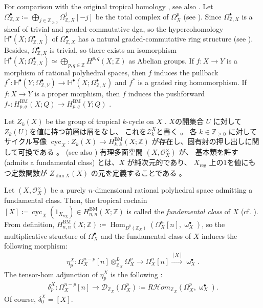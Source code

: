 \documentclass[a4paper,dvipdfmx,reqno,12pt]{amsart}
\theoremstyle{definition}
\newcommand{\deq}{\coloneqq}
\newcommand{\opn}[1]{\operatorname{#1}}
\newcommand{\xto}[1]{\xrightarrow{#1}}
\numberwithin{equation}{section}
\begin{document}
For comparison with the original
tropical homology \cite{MR3330789,MR3961331},
see also \cite[Remark 2.8 and Theorem 4.20]{MR4637248}.
Let $\Omega_{\mathbb{Z},X}^{\bullet}
\deq \bigoplus_{j\in \mathbb{Z}_{\geq 0}}
\Omega_{\mathbb{Z},X}^{j}[-j]$ 
be the total complex of 
$\Omega_{X}^{p}$ 
(see \cite[Proposition 3.1]{smacka2017differential}).
Since $\Omega_{\mathbb{Z},X}^{\bullet}$ is a sheaf
of trivial and graded-commutative dga, so the
hypercohomology 
$\mathbb{H}^{\bullet}(X;\Omega_{\mathbb{Z},X}^{\bullet})$
of $\Omega_{\mathbb{Z},X}^{\bullet}$ has
a natural graded-commutative ring structure
(see \cite[Remark 21.130]{gortzwedhorn2023}).
Besides, $\Omega_{\mathbb{Z},X}^{\bullet}$ is trivial,
so there exists an isomorphism
$\mathbb{H}^{\bullet}(X;\Omega_{\mathbb{Z},X}^{\bullet})
\simeq \bigoplus_{p,q\in \mathbb{Z}}
H^{p,q}(X;\mathbb{Z})$ as Abelian groups.
If $f\colon X\to Y$ is a morphism of
rational polyhedral spaces, then
$f$ induces the pullback
$f^{*}\colon \mathbb{H}^{\bullet}(Y;\Omega_{\mathbb{Z},Y}^{\bullet})
\to \mathbb{H}^{\bullet}(X;\Omega_{\mathbb{Z},X}^{\bullet})$
\cite[Proposition 4.18]{MR4637248} and $f^{*}$ is
a graded ring homomorphism.
If $f\colon X\to Y$ is a proper morphism, then
$f$ induces the pushforward 
$f_*\colon H^{\opn{BM}}_{p,q}(X;Q)\to 
H^{\opn{BM}}_{p,q}(Y;Q)$ \cite[Definition 4.9]{MR4637248}.

Let $Z_k(X)$ be the group of tropical $k$-cycle 
on $X$ \cite[Definition 3.5]{MR4637248}.
$X$の開集合 $U$ に対して$Z_k(U)$を値に持つ前層は層をなし、
これを$\mathscr{Z}_k^{X}$と書く
\cite[p.591]{MR4637248}。
各 $k\in \mathbb{Z}_{\geq 0}$ に対してサイクル写像
$\opn{cyc}_X \colon Z_k(X)\to 
H^{\mathrm{BM}}_{k,k}(X;\mathbb{Z})$
が存在し、固有射の押し出しに関して可換である
\cite[Definition 5.4 and Corollary 5.8]{MR4637248}。
(see also \cite[Definition 4.13]{MR3894860})
有理多面空間
$(X,\mathcal{O}_X^{\times})$ が、
基本類を許す
(admits a fundamental class)
とは、$X$ が純次元的であり、
$X_{\opn{reg}}$ 
上の$1$を値にもつ定数関数が
$Z_{\dim X}(X)$ の元を定義することである
\cite[]{MR4637248}。

Let $(X,\mathcal{O}_X^{\times})$ be 
a purely $n$-dimensional rational polyhedral space
admitting a fundamental class. Then, the
tropical cochain
$[X]\deq \opn{cyc}_X(1_{X_{\opn{reg}}})
\in H_{n,n}^{\mathrm{BM}}(X;\mathbb{Z})$ 
is called the \emph{fundamental class} of $X$
(cf. \cite[Definition 4.8]{MR3894860}). From definition,
$H_{n,n}^{\mathrm{BM}}
(X;\mathbb{Z})\deq \opn{Hom}_{D^{b}(\mathbb{Z}_X)}
(\Omega_{X}^{n}[n],\upomega_{X}^{\bullet})$, so
the multiplicative structure of $\Omega_X^{\bullet}$
and the fundamental class of $X$ induces
the following morphism:
\begin{align}
\eta_{p}^{X}\colon \Omega_X^{n-p}[n]\otimes^{L}_{\mathbb{Z}_X}
\Omega_X^{p} \to \Omega_X^{n}[n] \xto{[X]}
\upomega_X^{\bullet}. 	
\end{align}
The tensor-hom adjunction of $\eta_{p}^{X}$ is
the following \cite[p.627]{MR4637248}:
\begin{align}
\delta_p^{X}\colon \Omega_X^{n-p}[n]\to 
\mathcal{D}_{\mathbb{Z}_X}(\Omega_X^{p})
\deq R\mathcal{H}om_{\mathbb{Z}_X}(\Omega_X^{p},
\upomega_X^{\bullet}).
\end{align}
Of course, $\delta_0^{X}=[X]$.
\end{document}
